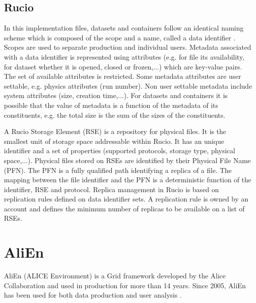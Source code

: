 \subsection{Rucio}
In this implementation files, datasets and containers follow an identical naming scheme which is composed of the
scope and a name, called a data identifier \cite{ATLAS-Rucio}. Scopes are used to separate production and individual
users. Metadata associated with a data identifier is represented using attributes (e.g. for file its availability,
for dataset whether it is opened, closed or frozen,...) which are key-value pairs. The set of available attributes 
is restricted. Some metadata attributes are user settable, e.g. physics attributes (run number). Non user settable 
metadata include system attributes (size, creation time,...). For datasets and containers it is possible that the 
value of metadata is a function of the metadata of its constituents, e.g. the total size is the sum of the
sizes of the constituents.

A Rucio Storage Element (RSE) is a repository for physical files. It is the smallest unit of
storage space addressable within Rucio. It has an unique identifier and a set of properties (supported protocols,
storage type, physical space,...). Physical files stored on RSEs are identified by their Physical File Name (PFN).
The PFN is a fully qualified path identifying a replica of a file. The mapping between the file identifier and
the PFN is a deterministic function of the identifier, RSE and protocol. Replica management in Rucio is based on
replication rules defined on data identifier sets. A replication rule is owned by an account and defines the 
minimum number of replicas to be available on a list of RSEs.

\section{AliEn}

AliEn (ALICE Environment) is a Grid framework developed by the Alice Collaboration and used in production for more 
than 14 years. Since 2005, AliEn has been used for both data production and user analysis \cite{AliEn2}. 

